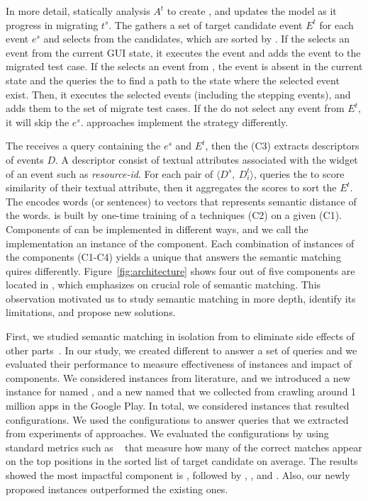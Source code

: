 \bigskip
In more detail, \generator statically analysis $A^t$ to create \tam, and updates the model as it progress in migrating $t^s$.
The \selector gathers a set of target candidate event $E^t$ for each event $e^s$ and selects from the candidates, which are sorted by \matcher.
If the \selector selects an event from the current GUI state, it executes the event and adds the event to the migrated test case.
If the \selector selects an event from \tam, the event is absent in the current state and the \selector queries the \tam to find a path to the state where the selected event exist.
Then, it executes the selected events (including the stepping events), and adds them to the set of migrate test cases.
If the \selector do not select any event from $E^t$, it will skip the $e^s$.
\testreuse approaches implement the \selector strategy differently.


\bigskip
The \matcher receives a query containing the $e^s$ and $E^t$, then the \ede (C3) extracts descriptors of events $D$.
A descriptor consist of textual attributes associated with the widget of an event such as \textit{resource-id}.
For each pair of $\langle D^s,  ~D_i^t\rangle$, \sma queries the \wem to score similarity of their textual attribute, then it aggregates the scores to sort the $E^t$.
The \wem encodes words (or sentences) to vectors that represents  semantic distance of the words.
\wem is built by one-time training of a \we techniques (C2) on a given \corpus (C1). 
%
Components of \testreuse can be implemented in different ways, and we call the implementation an instance of the component.
Each combination of instances of the \matcher components (C1-C4) yields a unique \smconfigs that answers the semantic matching quires differently.
 Figure~\ref{fig:architecture} shows four out of five \testreuse components are located in \matcher, which emphasizes on crucial role of semantic matching.
This observation motivated us to study semantic matching in more depth, identify its limitations, and propose new solutions.



\bigskip

 First, we studied semantic matching in isolation from \testreuse to eliminate side effects of other \testreuse parts~\cite{mariani:SemFinder:ISSTA:2021}.
In our study, we created different \smconfigs to answer  a set of queries and we evaluated their performance to measure effectiveness of instances and impact of components.
We considered instances from literature, and we introduced a new instance for \sma named \tool, and a new \corpus named \gp that we collected from crawling around 1 million apps in the Google Play. 
In total, we considered \ninstances instances that resulted \ncomb configurations.
We used the configurations to answer \nquery queries that we extracted from experiments of \testreuse approaches.
We evaluated the configurations by using standard metrics such as \mrr~\cite{liu:MRR:learning:2009} that measure how many of the correct matches  appear on the top positions in the sorted list of target candidate on average. 
The results showed the most impactful component is \sma, followed by \we, \ede, and \corpus. 
Also, our newly proposed instances outperformed the existing ones. 



